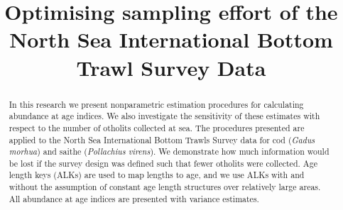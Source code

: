\documentclass[a4paper 12pt]{article}
\title{\bf 
}
\author{}
\date{}
\numberwithin{equation}{section}
\begin{document}
\title{Optimising sampling effort of the North Sea International Bottom Trawl Survey Data}

\maketitle


\begin{abstract}

In this research we present nonparametric estimation procedures for calculating abundance at age indices. We also investigate the sensitivity of these estimates with respect to the number of otholits collected at sea. The procedures presented are applied to the North Sea International Bottom Trawls Survey data for cod (\textit{Gadus morhua}) and saithe (\textit{Pollachius virens}). We demonstrate how much information would be lost if the survey design was defined such that fewer otholits were collected. Age length keys (ALKs) are used to map lengths to age, and we use ALKs with and without the assumption of constant age length structures over relatively large areas. All abundance at age indices are presented with variance estimates. \\

\end{abstract}
\end{document}
